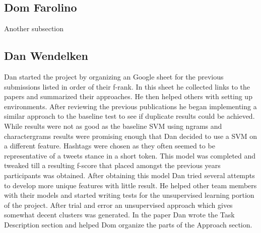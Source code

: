 \documentclass[11pt,letterpaper]{article}
\begin{document}
\subsection{Dom Farolino}
Another subsection

\subsection{Dan Wendelken}
Dan started the project by organizing an Google sheet for the previous submissions listed in order of their f-rank.  In this sheet he collected links to the papers and summarized their approaches.  He then helped others with setting up environments. After reviewing the previous publications he began implementing a similar approach to the baseline test to see if duplicate results could be achieved.  While results were not as good as the baseline SVM using ngrams and charactergrams results were promising enough that Dan decided to use a SVM on a different feature.  Hashtags were chosen as they often seemed to be representative of a tweets stance in a short token.  This model was completed and tweaked till a resulting f-score that placed amongst the previous years participants was obtained.  After obtaining this model Dan tried several attempts to develop more unique features with little result.  He helped other team members with their models and started writing tests for the unsupervised learning portion of the project.  After trial and error an unsupervised approach which gives somewhat decent clusters was generated.  In the paper Dan wrote the Task Description section and helped Dom organize the parts of the Approach section.



\end{document}

